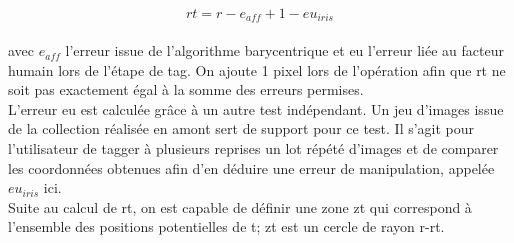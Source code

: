 \documentclass[a4paper, 12pt]{report}
\begin{document}
$$rt = r - e_{aff} + 1 - eu_{iris}$$ \\
avec $e_{aff}$ l'erreur issue de l'algorithme barycentrique et eu l'erreur liée au facteur humain lors de l'étape de tag. On ajoute 1 pixel lors de l'opération afin que rt ne soit pas exactement égal à la somme des erreurs permises.\\ L'erreur eu est calculée grâce à un autre test indépendant. Un jeu d'images issue de la collection réalisée en amont sert de support pour ce test. Il s'agit pour l'utilisateur de tagger à plusieurs reprises un lot répété d'images et de comparer les coordonnées obtenues afin d'en déduire une erreur de manipulation, appelée $eu_{iris}$ ici. \\
Suite au calcul de rt, on est capable de définir une zone zt qui correspond à l'ensemble des positions potentielles de t; zt est un cercle de rayon r-rt.
\end{document}
